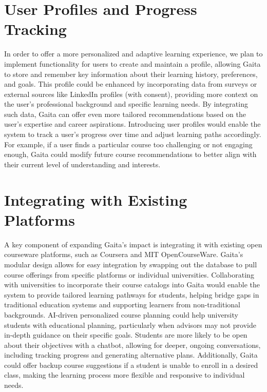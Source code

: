 \section{User Profiles and Progress Tracking} 

In order to offer a more personalized and adaptive learning experience, we plan to implement functionality for users to create and maintain a profile, allowing Gaita to store and remember key information about their learning history, preferences, and goals. This profile could be enhanced by incorporating data from surveys or external sources like LinkedIn profiles (with consent), providing more context on the user’s professional background and specific learning needs. By integrating such data, Gaita can offer even more tailored recommendations based on the user’s expertise and career aspirations. Introducing user profiles would enable the system to track a user’s progress over time and adjust learning paths accordingly. For example, if a user finds a particular course too challenging or not engaging enough, Gaita could modify future course recommendations to better align with their current level of understanding and interests. 

\section{Integrating with Existing Platforms}

A key component of expanding Gaita’s impact is integrating it with existing open courseware platforms, such as Coursera and MIT OpenCourseWare. Gaita’s modular design allows for easy integration by swapping out the database to pull course offerings from specific platforms or individual universities. Collaborating with universities to incorporate their course catalogs into Gaita would enable the system to provide tailored learning pathways for students, helping bridge gaps in traditional education systems and supporting learners from non-traditional backgrounds. AI-driven personalized course planning could help university students with educational planning, particularly when advisors may not provide in-depth guidance on their specific goals. Students are more likely to be open about their objectives with a chatbot, allowing for deeper, ongoing conversations, including tracking progress and generating alternative plans. Additionally, Gaita could offer backup course suggestions if a student is unable to enroll in a desired class, making the learning process more flexible and responsive to individual needs.

